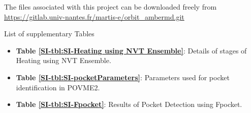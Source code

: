 \documentclass[12pt,a4paper]{achemso}
\begin{document}
The files associated with this project can be downloaded freely from  \url{https://gitlab.univ-nantes.fr/martis-e/orbit_ambermd.git}

\begin{suppinfo}

List of supplementary Tables
\begin{itemize}
 \item \textbf{Table \ref{SI-tbl:SI-Heating using NVT Ensemble}}: Details of stages of Heating using NVT Ensemble.
 \item \textbf{Table \ref{SI-tbl:SI-pocketParameters}}: Parameters used for pocket identification in POVME2.
 \item \textbf{Table \ref{SI-tbl:SI-Fpocket}}: Results of Pocket Detection using Fpocket.
\end{itemize}


\end{suppinfo}
\end{document}
